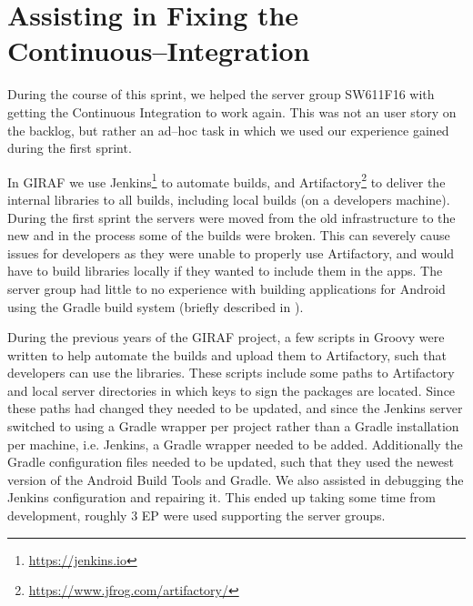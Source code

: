 \section{Assisting in Fixing the Continuous--Integration}
During the course of this sprint, we helped the server group SW611F16 with getting the Continuous Integration to work again.
This was not an user story on the backlog, but rather an ad--hoc task in which we used our experience gained during the first sprint.

In GIRAF we use Jenkins\footnote{\url{https://jenkins.io}} to automate builds, and Artifactory\footnote{\url{https://www.jfrog.com/artifactory/}} to deliver the internal libraries to all builds, including local builds (on a developers machine).
During the first sprint the servers were moved from the old infrastructure to the new and in the process some of the builds were broken.
This can severely cause issues for developers as they were unable to properly use Artifactory, and would have to build libraries locally if they wanted to include them in the apps.
The server group had little to no experience with building applications for Android using the Gradle build system (briefly described in ).

During the previous years of the GIRAF project, a few scripts in Groovy were written to help automate the builds and upload them to Artifactory, such that developers can use the libraries.
These scripts include some paths to Artifactory and local server directories in which keys to sign the packages are located.
Since these paths had changed they needed to be updated, and since the Jenkins server switched to using a Gradle wrapper per project rather than a Gradle installation per machine, i.e. Jenkins, a Gradle wrapper needed to be added.
Additionally the Gradle configuration files needed to be updated, such that they used the newest version of the Android Build Tools and Gradle.
We also assisted in debugging the Jenkins configuration and repairing it.
This ended up taking some time from development, roughly 3 EP were used supporting the server groups.

